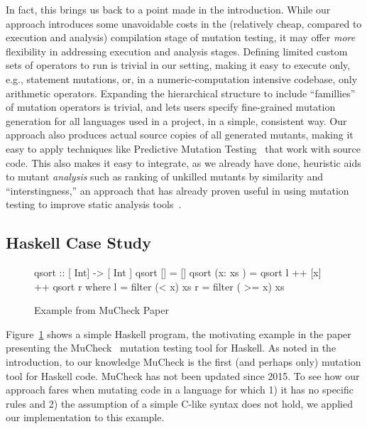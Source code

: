 \documentclass[sigconf,review, anonymous]{acmart}
\begin{document}
In fact, this brings us back to a point made in the introduction.
While our approach introduces some unavoidable costs in the
(relatively cheap, compared to execution and analysis) compilation stage of
mutation testing, it may offer \emph{more} flexibility in addressing
execution and analysis stages.  Defining limited custom sets of
operators to run is trivial in our setting, making it easy to
execute only, e.g., statement mutations, or, in a numeric-computation
intensive codebase, only arithmetic operators.  Expanding the
hierarchical structure to include ``famillies'' of mutation operators
is trivial, and lets users specify fine-grained mutation
generation for all languages used in a project, in a simple, consistent way.  Our approach also produces actual source
copies of all generated mutants, making it easy to apply techniques
like Predictive Mutation Testing~\cite{zhangPMT} that work with source
code.  This also makes it easy to integrate, as we already have done, heuristic
aids to mutant \emph{analysis} such as ranking of unkilled mutants by
similarity and ``interstingness,'' an approach that has already proven
useful in using mutation testing to improve static analysis tools~\cite{StatMut}.

\subsection{Haskell Case Study}

\begin{figure}

  \begin{code}
 qsort :: [ Int] -> [ Int ]
 qsort [] = []
 qsort (x: xs ) = qsort l ++ [x] ++ qsort r
     where l = filter (< x) xs
           r = filter ( >= x) xs
\end{code}
\caption{Example from MuCheck Paper}
\label{fig:haskell}

\end{figure}

Figure~\ref{fig:haskell} shows a simple Haskell program, the
motivating example in the paper presenting the MuCheck~\cite{mucheck}
mutation testing tool for Haskell.  As noted in the introduction, to our
knowledge MuCheck is the first (and perhaps only) mutation tool for
Haskell code.  MuCheck has not been updated since 2015.
To see how our approach fares when mutating code in a language for
which 1) it has no specific rules and 2) the assumption of a simple
C-like syntax does not hold, we applied our implementation to this example.
\end{document}
